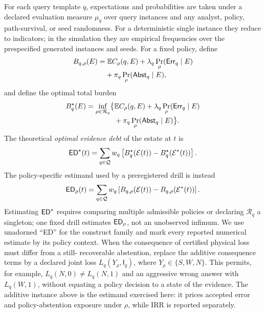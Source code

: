 \begin{definition}
For each query template $q$, expectations and probabilities are taken under a
declared evaluation measure $\mu_q$ over query instances and any analyst, policy,
path-survival, or seed randomness. For a deterministic single instance they reduce
to indicators; in the simulation they are empirical frequencies over the
prespecified generated instances and seeds. For a fixed policy, define
\begin{align*}
B_{q,\rho}(E)=&\;\mathbb E C_\rho(q,E)
+\lambda_q\Pr_\rho(\mathsf{Err}_q\mid E)\\[-2pt]
&+\pi_q\Pr_\rho(\mathsf{Abst}_q\mid E),
\end{align*}
and define the optimal total burden
\begin{align*}
B_q^{\star}(E)=\inf_{\rho\in\mathcal R_q}\bigl\{
&\mathbb E C_\rho(q,E)+\lambda_q\Pr_\rho(\mathsf{Err}_q\mid E)\\[-2pt]
&+\pi_q\Pr_\rho(\mathsf{Abst}_q\mid E)\bigr\}.
\end{align*}
The theoretical \emph{optimal evidence debt} of the estate at $t$ is
\begin{equation*}
\mathsf{ED}^{\star}(t)=\sum_{q\in\mathcal{Q}}w_q
\left[B_q^{\star}(\mathcal{E}(t))-B_q^{\star}(\mathcal{E}^{*}(t))\right].
\end{equation*}
The policy-specific estimand used by a preregistered drill is instead
\begin{equation*}
\mathsf{ED}_{\rho}(t)=\sum_{q\in\mathcal{Q}}w_q
\left[B_{q,\rho}(\mathcal{E}(t))-B_{q,\rho}(\mathcal{E}^{*}(t))\right].
\end{equation*}
Estimating $\mathsf{ED}^{\star}$ requires comparing multiple admissible policies or
declaring $\mathcal R_q$ a singleton; one fixed drill estimates $\mathsf{ED}_\rho$, not an
unobserved infimum. We use unadorned ``ED'' for the construct family and mark every
reported numerical estimate by its policy context.
When the consequence of certified physical loss must differ from a still-
recoverable abstention, replace the additive consequence terms by a declared joint
loss $L_q(Y_\rho,\mathsf I_q)$, where $Y_\rho\in\{S,W,N\}$. This permits, for
example, $L_q(N,0)\ne L_q(N,1)$ and an aggressive wrong answer with
$L_q(W,1)$, without equating a policy decision to a state of the evidence. The
additive instance above is the estimand exercised here: it prices accepted error
and policy-abstention exposure under $\rho$, while IRR is reported separately.


\end{definition}

